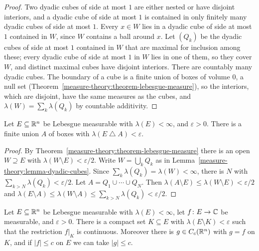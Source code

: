 \begin{proof}
Two dyadic cubes of side at most $1$ are either nested or have disjoint interiors, and a dyadic cube of side at most $1$ is contained in only finitely many
dyadic cubes of side at most $1$. Every $x \in W$ lies in a dyadic cube of side at most $1$ contained in $W$, since $W$ contains a ball around $x$. Let
$(Q_k)$ be the dyadic cubes of side at most $1$ contained in $W$ that are maximal for inclusion among these; every dyadic cube of side at most $1$ in $W$ lies in
one of them, so they cover $W$, and distinct maximal cubes have disjoint interiors. There are countably many dyadic cubes. The boundary of a cube is a
finite union of boxes of volume $0$, a null set (Theorem~\ref{measure-theory:theorem-lebesgue-measure}), so the interiors, which are disjoint, have the same
measures as the cubes, and $\lambda(W) = \sum_k\lambda(Q_k)$ by countable additivity.
\end{proof}

\begin{proposition}\label{measure-theory:proposition-approximation-boxes}
Let $E \subseteq \mathbb{R}^n$ be Lebesgue measurable with $\lambda(E) < \infty$, and $\varepsilon > 0$. There is a finite union $A$ of boxes with
$\lambda(E \mathbin{\triangle} A) < \varepsilon$.
\end{proposition}

\begin{proof}
By Theorem~\ref{measure-theory:theorem-lebesgue-measure} there is an open $W \supseteq E$ with $\lambda(W \setminus E) < \varepsilon/2$. Write $W = \bigcup_kQ_k$ as in
Lemma~\ref{measure-theory:lemma-dyadic-cubes}. Since $\sum_k\lambda(Q_k) = \lambda(W) < \infty$, there is $N$ with $\sum_{k > N}\lambda(Q_k) < \varepsilon/2$. Let
$A = Q_1 \cup \cdots \cup Q_N$. Then $\lambda(A \setminus E) \leq \lambda(W \setminus E) < \varepsilon/2$ and
$\lambda(E \setminus A) \leq \lambda(W \setminus A) \leq \sum_{k > N}\lambda(Q_k) < \varepsilon/2$.
\end{proof}

\begin{theorem}[Lusin]\label{measure-theory:theorem-lusin}
Let $E \subseteq \mathbb{R}^n$ be Lebesgue measurable with $\lambda(E) < \infty$, let $f \colon E \to \mathbb{C}$ be measurable, and $\varepsilon > 0$. There is a compact set
$K \subseteq E$ with $\lambda(E \setminus K) < \varepsilon$ such that the restriction $f|_K$ is continuous. Moreover there is $g \in C_c(\mathbb{R}^n)$ with $g = f$ on $K$,
and if $|f| \leq c$ on $E$ we can take $|g| \leq c$.
\end{theorem}

